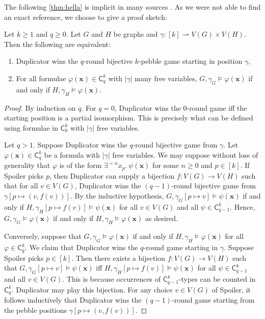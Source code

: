\documentclass{lmcs}
\theoremstyle{plain}\newtheorem{claim}[thm]{Claim}   %
\renewcommand\phi\varphi
\begin{document}
The following \autoref{thm:hella} is implicit in many sources \cite{Cai_optimal_1992, Hella_logical_1996}.
As we were not able to find an exact reference, we choose to give a proof sketch:

\begin{thm} \label{thm:hella}
	Let $k\geq 1$ and $q \geq 0$.
	Let $G$ and $H$ be graphs and $\gamma \colon [k] \rightharpoonup V(G) \times V(H)$.
	Then the following are equivalent:
	\begin{enumerate}
		\item Duplicator wins the $q$-round bijective $k$-pebble game starting in position $\gamma$,
		\item For all formulae $\phi(\boldsymbol{x}) \in \mathsf{C}^k_q$ with $|\gamma|$ many free variables, $G, \gamma_G \models \phi(\boldsymbol{x})$ if and only if $H, \gamma_H \models \phi(\boldsymbol{x})$.
	\end{enumerate}
\end{thm}

\begin{proof}
	By induction on $q$.
	For $q = 0$, Duplicator wins the $0$-round game iff the starting position is a partial isomorphism.
	This is precisely what can be defined using formulae in $\mathsf{C}^{k}_0$ with $|\gamma|$ free variables.
	
	Let $q > 1$.
	Suppose Duplicator wins the $q$-round bijective game from $\gamma$.
	Let $\phi(\boldsymbol{x}) \in \mathsf{C}^k_q$ be a formula with $|\gamma|$ free variables.
	We may suppose without loss of generality that $\phi$ is of the form $\exists^{=n} x_p.\ \psi(\boldsymbol{x})$ for some $n \geq 0$ and $p \in [k]$.
	If Spoiler picks $p$, then Duplicator can supply a bijection $f \colon V(G) \to V(H)$ such that for all $v \in V(G)$, Duplicator wins the $(q-1)$-round bijective game from $\gamma[p \mapsto (v, f(v))]$.
	By the inductive hypothesis, $G, \gamma_G[p \mapsto v] \models \psi(\boldsymbol{x})$ if and only if $H, \gamma_H[p \mapsto f(v)] \models \psi(\boldsymbol{x})$ for all $v \in V(G)$ and all $\psi \in \mathsf{C}^k_{q-1}$.
	Hence, $G, \gamma_G \models \phi(\boldsymbol{x})$ if and only if $H,\gamma_H \models \phi(\boldsymbol{x})$ as desired.
	
	Conversely, suppose that $G, \gamma_G \models \phi(\boldsymbol{x})$ if and only if $H, \gamma_H \models \phi(\boldsymbol{x})$ for all $\phi \in \mathsf{C}^k_q$.
	We claim that Duplicator wins the $q$-round game starting in $\gamma$.
	Suppose Spoiler picks $p \in [k]$.
	Then there exists a bijection $f \colon V(G) \to V(H)$ such that $G, \gamma_G[p \mapsto v] \models \psi(\boldsymbol{x})$ iff $H, \gamma_H[p \mapsto f(v)] \models \psi(\boldsymbol{x})$ for all $\psi \in \mathsf{C}^k_{q-1}$ and all $v \in V(G)$.
	This is because occurrences of $\mathsf{C}^k_{q-1}$-types can be counted in $\mathsf{C}^k_q$.
	Duplicator may play this bijection.
	For any choice $v \in V(G)$ of Spoiler, it follows inductively that Duplicator wins the $(q-1)$-round game starting from the pebble positions $\gamma[p \mapsto (v, f(v))]$.
\end{proof}
\end{document}
